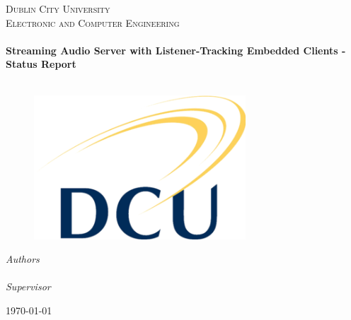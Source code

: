 \begin{titlepage}
  \begin{center}

    \textsc{\LARGE Dublin City University}\\[1.5cm]
    \textsc{\Large Electronic and Computer Engineering}\\[0.5cm]

    \HRule\\[0.4cm]
    {\huge \bfseries Streaming Audio Server with Listener-Tracking Embedded Clients - Status Report\\[0.4cm]}
    \HRule\\[1.5cm]
	
    \begin{figure}[H]
	\includegraphics{images/Dcu-logo.png}
	\centering
    \end{figure}

    \emph{Authors}\\[0.1cm]
    \noindent{}\\[0.1cm]

    \emph{Supervisor}
    \noindent{}\\[1cm]

    \vfill

    {\large \today}

  \end{center}
\end{titlepage}
